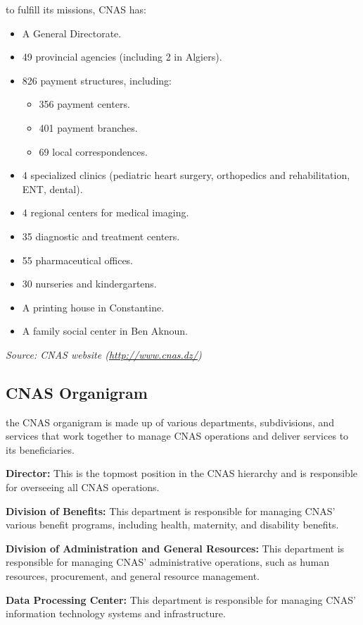 to fulfill its missions, CNAS has: 
\begin{itemize}
\item A General Directorate.
\item 49 provincial agencies (including 2 in Algiers).
\item 826 payment structures, including:
\begin{itemize}
\item 356 payment centers.
\item 401 payment branches.
\item 69 local correspondences.
\end{itemize}
\item 4 specialized clinics (pediatric heart surgery, orthopedics and rehabilitation, ENT, dental).
\item 4 regional centers for medical imaging.
\item 35 diagnostic and treatment centers.
\item 55 pharmaceutical offices.
\item 30 nurseries and kindergartens.
\item A printing house in Constantine.
\item A family social center in Ben Aknoun.
\end{itemize}

\textit{Source: CNAS website (\url{http://www.cnas.dz/})}

\subsection{CNAS Organigram}
the CNAS organigram is made up of various departments, subdivisions, and services that work together to manage CNAS operations and deliver services to its beneficiaries.

\textbf{Director:} This is the topmost position in the CNAS hierarchy and is responsible for overseeing all CNAS operations.

\textbf{Division of Benefits:} This department is responsible for managing CNAS' various benefit programs, including health, maternity, and disability benefits.

\textbf{Division of Administration and General Resources:} This department is responsible for managing CNAS' administrative operations, such as human resources, procurement, and general resource management.

\textbf{Data Processing Center:} This department is responsible for managing CNAS' information technology systems and infrastructure.

